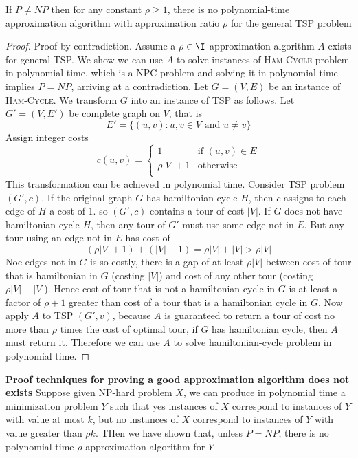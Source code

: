 \documentclass[11pt]{article}
\begin{document}
\begin{theorem*}
    If $P\neq NP$ then for any constant $\rho \geq 1$, there is no polynomial-time approximation algorithm with approximation ratio $\rho$ for the general TSP problem
    \begin{proof}
        Proof by contradiction. Assume a $\rho \in \I$-approximation algorithm $A$ exists for general TSP. We show we can use $A$ to solve instances of \textsc{Ham-Cycle} problem in polynomial-time, which is a NPC problem and solving it in polynomial-time implies $P = NP$, arriving at a contradiction. Let $G=(V,E)$ be an instance of \textsc{Ham-Cycle}. We transform $G$ into an instance of TSP as follows. Let $G' = (V, E')$ be complete graph on $V$, that is 
        \[
            E' = \{ (u,v): u,v\in V \text{ and } u\neq v \}
        \]
        Assign integer costs 
        \[
            c(u,v)=
            \begin{cases}
                1 & \text{if } (u,v)\in E \\
                \rho|V| + 1 & \text{otherwise}\\
            \end{cases}
        \]
        This transformation can be achieved in polynomial time. Consider TSP problem $(G',c)$. If the original graph $G$ has hamiltonian cycle $H$, then $c$ assigns to each edge of $H$ a cost of 1. so $(G',c)$ contains a tour of cost $|V|$. If $G$ does not have hamiltonian cycle $H$, then any tour of $G'$ must use some edge not in $E$. But any tour using an edge not in $E$ has cost of 
        \[
            (\rho|V| + 1) + (|V| - 1) = \rho|V| + |V| > \rho |V|
        \]
        Noe edges not in $G$ is so costly, there is a gap of at least $\rho|V|$ between cost of tour that is hamiltonian in $G$ (costing $|V|$) and cost of any other tour (costing $\rho|V| + |V|$). Hence cost of tour that is not a hamiltonian cycle in $G$ is at least a factor of $\rho + 1$ greater than cost of a tour that is a hamiltonian cycle in $G$. Now apply $A$ to TSP $(G',v)$, because $A$ is guaranteed to return a tour of cost no more than $\rho$ times the cost of optimal tour, if $G$ has hamiltonian cycle, then $A$ must return it. Therefore we can use $A$ to solve hamiltonian-cycle problem in polynomial time.
    \end{proof}
\end{theorem*}

\begin{defn*}
    \textbf{Proof techniques for proving a good approximation algorithm does not exists} Suppose given NP-hard problem $X$, we can produce in polynomial time a minimization problem $Y$ such that yes instances of $X$ correspond to instances of $Y$ with value at most $k$, but no instances of $X$ correspond to instances of $Y$ with value greater than $\rho k$. THen we have shown that, unless $P=NP$, there is no polynomial-time $\rho$-approximation algorithm for $Y$
\end{defn*}
\end{document}
